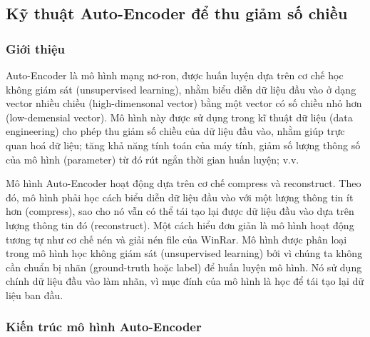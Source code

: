 \subsection{Kỹ thuật Auto-Encoder để thu giảm số chiều}
\subsubsection{Giới thiệu}

Auto-Encoder là mô hình mạng nơ-ron, được huấn luyện dựa trên cơ chế học không giám sát (unsupervised learning), nhằm biểu diễn dữ liệu đầu vào ở dạng vector nhiều chiều (high-dimensonal vector) bằng một vector có số chiều nhỏ hơn (low-demensial vector). Mô hình này được sử dụng trong kĩ thuật dữ liệu (data engineering) cho phép thu giảm số chiều của dữ liệu đầu vào, nhằm giúp trực quan hoá dữ liệu; tăng khả năng tính toán của máy tính, giảm số lượng thông số của mô hình (parameter) từ đó rút ngắn thời gian huấn luyện; v.v. 

Mô hình Auto-Encoder hoạt động dựa trên cơ chế compress và reconstruct. Theo đó, mô hình phải học cách biểu diễn dữ liệu đầu vào với một lượng thông tin ít hơn (compress), sao cho nó vẫn có thể tái tạo lại được dữ liệu đầu vào dựa trên lượng thông tin đó (reconstruct). Một cách hiểu đơn giản là mô hình hoạt động tương tự như cơ chế nén và giải nén file của WinRar. Mô hình được phân loại trong mô hình học không giám sát (unsupervised learning) bởi vì chúng ta không cần chuẩn bị nhãn (ground-truth hoặc label) để huấn luyện mô hình. Nó sử dụng chính dữ liệu đầu vào làm nhãn, vì mục đính của mô hình là học để tái tạo lại dữ liệu ban đầu.

\subsubsection{Kiến trúc mô hình Auto-Encoder}

